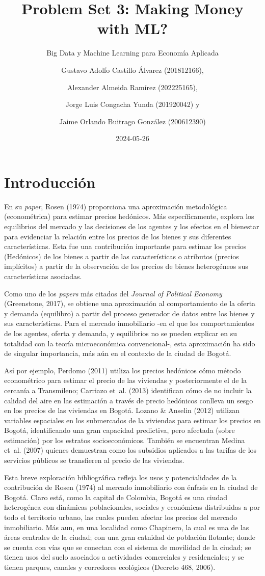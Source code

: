 \documentclass[
  11pt,
  letterpaper,
]{article}
\title{Problem Set 3: Making Money with ML?}
\subtitle{Big Data y Machine Learning para Economía Aplicada}
\author{Gustavo Adolfo Castillo Álvarez (201812166), \and Alexander Almeida Ramírez (202225165), \and Jorge Luis Congacha Yunda (201920042) y \and Jaime Orlando Buitrago González (200612390)}
\date{2024-05-26}
\begin{document}
\maketitle

\hypertarget{introducciuxf3n}{%
\section{Introducción}\label{introducciuxf3n}}

En su \textit{paper}, Rosen (1974) proporciona una aproximación metodológica (econométrica) para estimar precios hedónicos. Más específicamente, explora los equilibrios del mercado y las decisiones de los agentes y los efectos en el bienestar para evidenciar la relación entre los precios de los bienes y sus diferentes características. Esta fue una contribución importante para estimar los precios (Hedónicos) de los bienes a partir de las características o atributos (precios implícitos) a partir de la observación de los precios de bienes heterogéneos sus características asociadas.

Como uno de los \textit{papers} más citados del \textit{Journal of Political Economy} (Greenstone, 2017), se obtiene una aproximación al comportamiento de la oferta y demanda (equilibro) a partir del proceso generador de datos entre los bienes y sus características. Para el mercado inmobiliario -en el que los comportamientos de los agentes, oferta y demanda, y equilibrios no se pueden explicar en su totalidad con la teoría microeconómica convencional-, esta aproximación ha sido de singular importancia, más aún en el contexto de la ciudad de Bogotá.

Así por ejemplo, Perdomo (2011) utiliza los precios hedónicos cómo método econométrico para estimar el precio de las viviendas y posteriormente el de la cercanía a Transmileno; Carriazo et~al. (2013) identifican cómo de no incluir la calidad del aire en las estimación a través de precio hedónicos conlleva un sesgo en los precios de las viviendas en Bogotá. Lozano \& Anselin (2012) utilizan variables espaciales en los submercados de la viviendas para estimar los precios en Bogotá, identificando una gran capacidad predictiva, pero afectada (sobre estimación) por los estratos socioeconómicos. También se encuentran Medina et~al. (2007) quienes demuestran como los subsidios aplicados a las tarifas de los servicios públicos se transfieren al precio de las viviendas.

Esta breve exploración bibliográfica refleja los usos y potencialidades de la contribución de Rosen (1974) al mercado inmobiliario con énfasis en la ciudad de Bogotá. Claro está, como la capital de Colombia, Bogotá es una ciudad heterogénea con dinámicas poblacionales, sociales y económicas distribuidas a por todo el territorio urbano, las cuales pueden afectar los precios del mercado inmobiliario. Más aun, en una localidad como Chapinero, la cual es una de las áreas centrales de la ciudad; con una gran catnidad de población flotante; donde se cuenta con vías que se conectan con el sistema de movilidad de la ciudad; se tienen usos del suelo asociados a actividades comerciales y residenciales; y se tienen parques, canales y corredores ecológicos (Decreto 468, 2006).
\end{document}
